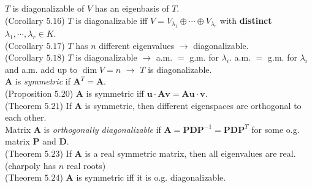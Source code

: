 \documentclass{article}
\theoremstyle{definition}
\begin{document}
$T$ is diagonalizable of $V$ has an eigenbasis of $T$.\\
(Corollary $5.16$) $T$ is diagonalizable iff $V=V_{\lambda_{1}}\oplus\cdots\oplus V_{\lambda_{r}}$ with \textbf{distinct} $\lambda_{1},\cdots,\lambda_{r}\in K$.\\
(Corollary $5.17$) $T$ has $n$ different eigenvalues $\longrightarrow$ diagonalizable.\\
(Corollary $5.18$) $T$ is diagonalizable $\longrightarrow$ a.m. $=$ g.m. for $\lambda_{i}$. a.m. $=$ g.m. for $\lambda_{i}$ and a.m. add up to $\dim{V}=n$ $\longrightarrow$ $T$ is diagonalizable.\\
$\mathbf{A}$ is \textit{symmetric} if $\mathbf{A}^{T}=\mathbf{A}$.\\
(Proposition $5.20$) $\mathbf{A}$ is symmetric iff $\mathbf{u}\cdot\mathbf{Av}=\mathbf{Au}\cdot\mathbf{v}$.\\
(Theorem $5.21$) If $\mathbf{A}$ is symmetric, then different eigenspaces are orthogonal to each other.\\
Matrix $\mathbf{A}$ is \textit{orthogonally diagonalizable} if $\mathbf{A}=\mathbf{PDP}^{-1}=\mathbf{PDP}^{T}$ for some o.g. matrix $\mathbf{P}$ and $\mathbf{D}$.\\
(Theorem $5.23$) If $\mathbf{A}$ is a real symmetric matrix, then all eigenvalues are real. (charpoly has $n$ real roots)\\
(Theorem $5.24$) $\mathbf{A}$ is symmetric iff it is o.g. diagonalizable.
\end{document}
